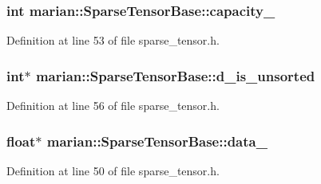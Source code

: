 \subsubsection[{\texorpdfstring{capacity\+\_\+}{capacity_}}]{\setlength{\rightskip}{0pt plus 5cm}int marian\+::\+Sparse\+Tensor\+Base\+::capacity\+\_\+\hspace{0.3cm}{\ttfamily [private]}}\hypertarget{classmarian_1_1SparseTensorBase_a141ed92eb61d17e41085f55c57446dc1}{}\label{classmarian_1_1SparseTensorBase_a141ed92eb61d17e41085f55c57446dc1}


Definition at line 53 of file sparse\+\_\+tensor.\+h.

\subsubsection[{\texorpdfstring{d\+\_\+is\+\_\+unsorted}{d_is_unsorted}}]{\setlength{\rightskip}{0pt plus 5cm}int$\ast$ marian\+::\+Sparse\+Tensor\+Base\+::d\+\_\+is\+\_\+unsorted\hspace{0.3cm}{\ttfamily [private]}}\hypertarget{classmarian_1_1SparseTensorBase_a650c5100969356a168d15b61b8f09d5f}{}\label{classmarian_1_1SparseTensorBase_a650c5100969356a168d15b61b8f09d5f}


Definition at line 56 of file sparse\+\_\+tensor.\+h.

\subsubsection[{\texorpdfstring{data\+\_\+}{data_}}]{\setlength{\rightskip}{0pt plus 5cm}float$\ast$ marian\+::\+Sparse\+Tensor\+Base\+::data\+\_\+\hspace{0.3cm}{\ttfamily [private]}}\hypertarget{classmarian_1_1SparseTensorBase_a633f417eb28496e8c0268e551e1992cf}{}\label{classmarian_1_1SparseTensorBase_a633f417eb28496e8c0268e551e1992cf}


Definition at line 50 of file sparse\+\_\+tensor.\+h.

